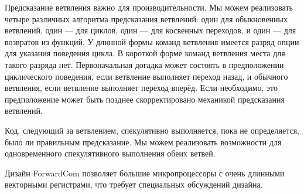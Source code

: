 \documentclass[forwardcom.tex]{subfiles}
\begin{document}
Предсказание ветвления важно для производительности. Мы можем реализовать четыре различных алгоритма предсказания ветвлений: один для обыкновенных ветвлений, один --- для циклов, один --- для косвенных переходов, и один --- для возвратов из функций. У длинной формы команд ветвления имеется разряд опции для указания поведения цикла. В короткой форме команд ветвления места для такого разряда нет. Первоначальная догадка может состоять в предположении циклического поведения, если ветвление выполняет переход назад, и обычного ветвления, если ветвление выполняет переход вперёд. Если необходимо, это предположение может быть позднее скорректировано механикой  предсказания ветвлений. 

Код, следующий за ветвлением, спекулятивно выполняется, пока не определяется, было ли правильным предсказание. Мы можем реализовать возможности для одновременного спекулятивного выполнения обеих ветвей.

Дизайн  ForwardCom позволяет большие микропроцессоры с очень длинными векторными регистрами, что требует специальных обсуждений дизайна. 
%
\end{document}
